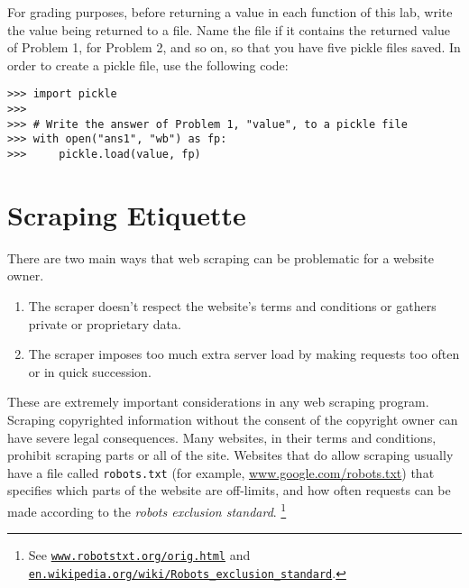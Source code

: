 

\begin{info}
For grading purposes, before returning a value in each function of this lab, write the value being returned to a  file.
Name the file  if it contains the returned value of Problem 1,  for Problem 2, and so on, so that you have five pickle files saved.
In order to create a pickle file, use the following code:
\begin{lstlisting}
>>> import pickle
>>>
>>> # Write the answer of Problem 1, "value", to a pickle file
>>> with open("ans1", "wb") as fp:
>>>     pickle.load(value, fp)
\end{lstlisting}
\end{info}

\section*{Scraping Etiquette} %


There are two main ways that web scraping can be problematic for a website owner.
\begin{enumerate}
\item The scraper doesn't respect the website's terms and conditions or gathers private or proprietary data.
\item The scraper imposes too much extra server load by making requests too often or in quick succession.
\end{enumerate}
These are extremely important considerations in any web scraping program.
Scraping copyrighted information without the consent of the copyright owner can have severe legal consequences.
Many websites, in their terms and conditions, prohibit scraping parts or all of the site.
Websites that do allow scraping usually have a file called \texttt{robots.txt} (for example, \url{www.google.com/robots.txt}) that specifies which parts of the website are off-limits, and how often requests can be made according to the \emph{robots exclusion standard}.%
\footnote{See \href{http://www.robotstxt.org/orig.html}{\texttt{www.robotstxt.org/orig.html}} and \href{https://en.wikipedia.org/wiki/Robots_exclusion_standard}{\texttt{en.wikipedia.org/wiki/Robots\_exclusion\_standard}}.}


